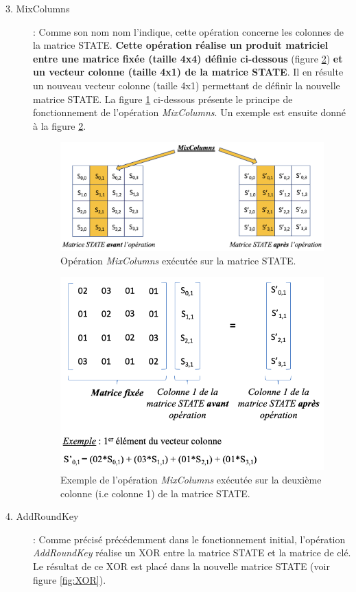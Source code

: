 \documentclass[oneside]{book}
\begin{document}
\begin{description}
\newpage
\item[3. MixColumns] : Comme son nom nom l'indique, cette opération concerne les colonnes de la matrice STATE. \textbf{Cette opération réalise un produit matriciel entre une matrice fixée (taille 4x4) définie ci-dessous} (figure \ref{fig:colonnebis}) \textbf{et un vecteur colonne (taille 4x1) de la matrice STATE}. Il en résulte un nouveau vecteur colonne (taille 4x1) permettant de définir la nouvelle matrice STATE.
La figure \ref{fig:colonne} ci-dessous présente le principe de fonctionnement de l'opération \textit{MixColumns}. Un exemple est ensuite donné à la figure \ref{fig:colonnebis}.

\begin{figure}[htbp]
    \centering
    \includegraphics[scale=0.55]{image/colonne}
    \caption{Opération \textit{MixColumns} exécutée sur la matrice STATE.}
    \label{fig:colonne}
\end{figure}
\begin{figure}[htbp]
    \centering
    \includegraphics[scale=0.42]{image/colonnebis}
    \caption{Exemple de l'opération \textit{MixColumns} exécutée sur la deuxième colonne (i.e colonne 1) de la matrice STATE.}
    \label{fig:colonnebis}
\end{figure}
\vspace{1cm}

\item[4. AddRoundKey] : Comme précisé précédemment dans le fonctionnement initial, l'opération \textit{AddRoundKey} réalise un XOR entre la matrice STATE et la matrice de clé. Le résultat de ce XOR est placé dans la nouvelle matrice STATE (voir figure \ref{fig:XOR}).\\ 
\end{description}
\end{document}
